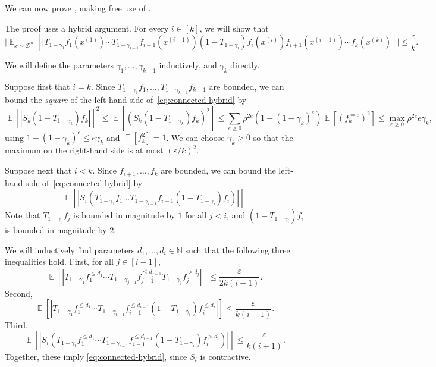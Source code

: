 \documentclass{article}
\theoremstyle{definition}
\theoremstyle{remark}
\DeclareMathOperator*{\E}{\mathbb{E}}
\newcommand\eps{\varepsilon}
\renewcommand\epsilon{\eps}
\renewcommand\geq{\geqslant}
\renewcommand\leq{\leqslant}
\begin{document}
We can now prove , making free use of .

The proof uses a hybrid argument. For every $i \in [k]$, we will show that
\begin{equation} \label{eq:connected-hybrid}
 \bigl|\E_{x \sim \mathcal{D}^n}[|T_{1-\gamma_1} f_1(x^{(1)}) \cdots T_{1-\gamma_{i-1}} f_{i-1}(x^{(i-1)}) (1-T_{1-\gamma_i}) f_i(x^{(i)}) f_{i+1}(x^{(i+1)}) \cdots f_k(x^{(k)})]\bigr| \leq \frac{\epsilon}{k}.
\end{equation}

We will define the parameters $\gamma_1,\ldots,\gamma_{k-1}$ inductively, and $\gamma_k$ directly.

Suppose first that $i = k$. Since $T_{1-\gamma_1} f_1,\ldots,T_{1-\gamma_{k-1}} f_{k-1}$ are bounded, we can bound the \emph{square} of the left-hand side of~\eqref{eq:connected-hybrid} by
\[
 \E[|S_k(1-T_{1-\gamma_k}) f_k|]^2 \leq
 \E[(S_k(1-T_{1-\gamma_k}) f_k)^2] \leq
 \sum_{e \geq 0} \rho^{2e} (1-(1-\gamma_k)^e) \E[(f_k^{=e})^2] \leq \max_{e \geq 0} \rho^{2e} e\gamma_k,
\]
using $1 - (1-\gamma_k)^e \leq e\gamma_k$ and
$\E[f_k^2] = 1$. We can choose $\gamma_k > 0$ so that the maximum on the right-hand side is at most $(\epsilon/k)^2$.

Suppose next that $i < k$.
Since $f_{i+1},\ldots,f_k$ are bounded, we can bound the left-hand side of~\eqref{eq:connected-hybrid} by
\[
 \E[|S_i(T_{1-\gamma_1} f_1\ldots T_{1-\gamma_{i-1}} f_{i-1} (1-T_{1-\gamma_i}) f_i)|].
\]
Note that $T_{1-\gamma_j} f_j$ is bounded in magnitude by $1$ for all $j < i$, and $(1-T_{1-\gamma_i}) f_i$ is bounded in magnitude by $2$.

We will inductively find parameters $d_1,\ldots,d_i \in \mathbb{N}$ such that the following three inequalities hold.
First, for all $j \in [i-1]$,
\begin{equation} \label{eq:connected-1}
 \E[|T_{1-\gamma_1} f_1^{\leq d_1} \cdots T_{1-\gamma_{j-1}} f_{j-1}^{\leq d_{j-1}} T_{1-\gamma_j} f_j^{>d_j}|] \leq \frac{\epsilon}{2k(i+1)}.
\end{equation}
Second,
\begin{equation} \label{eq:connected-2}
 \E[|T_{1-\gamma_1} f_1^{\leq d_1} \cdots T_{1-\gamma_{i-1}} f_{i-1}^{\leq d_{i-1}} (1-T_{1-\gamma_i}) f_i^{\leq d_i}|] \leq \frac{\epsilon}{k(i+1)}.
\end{equation}
Third,
\begin{equation} \label{eq:connected-3}
 \E[|S_i (T_{1-\gamma_1} f_1^{\leq d_1} \cdots T_{1-\gamma_{i-1}} f_{i-1}^{\leq d_{i-1}} (1-T_{1-\gamma_i}) f_i^{> d_i})|] \leq \frac{\epsilon}{k(i+1)}.
\end{equation}
Together, these imply \eqref{eq:connected-hybrid}, since $S_i$ is contractive. %
\end{document}

